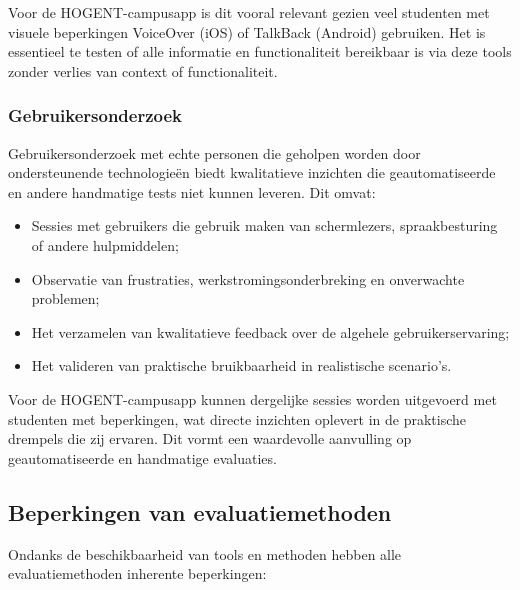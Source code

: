 Voor de HOGENT-campusapp is dit vooral relevant gezien veel studenten met visuele beperkingen VoiceOver (iOS) of TalkBack (Android) gebruiken. Het is essentieel te testen of alle informatie en functionaliteit bereikbaar is via deze tools zonder verlies van context of functionaliteit.

\subsubsection{Gebruikersonderzoek}

Gebruikersonderzoek met echte personen die geholpen worden door ondersteunende technologieën biedt kwalitatieve inzichten die geautomatiseerde en andere handmatige tests niet kunnen leveren. Dit omvat:

\begin{itemize}
    \item Sessies met gebruikers die gebruik maken van schermlezers, spraakbesturing of andere hulpmiddelen;
    \item Observatie van frustraties, werkstromingsonderbreking en onverwachte problemen;
    \item Het verzamelen van kwalitatieve feedback over de algehele gebruikerservaring;
    \item Het valideren van praktische bruikbaarheid in realistische scenario's.
\end{itemize}

Voor de HOGENT-campusapp kunnen dergelijke sessies worden uitgevoerd met studenten met beperkingen, wat directe inzichten oplevert in de praktische drempels die zij ervaren. Dit vormt een waardevolle aanvulling op geautomatiseerde en handmatige evaluaties.

\subsection{Beperkingen van evaluatiemethoden}
\label{subsec:beperkingen-evaluatiemethoden}

Ondanks de beschikbaarheid van tools en methoden hebben alle evaluatiemethoden inherente beperkingen:

